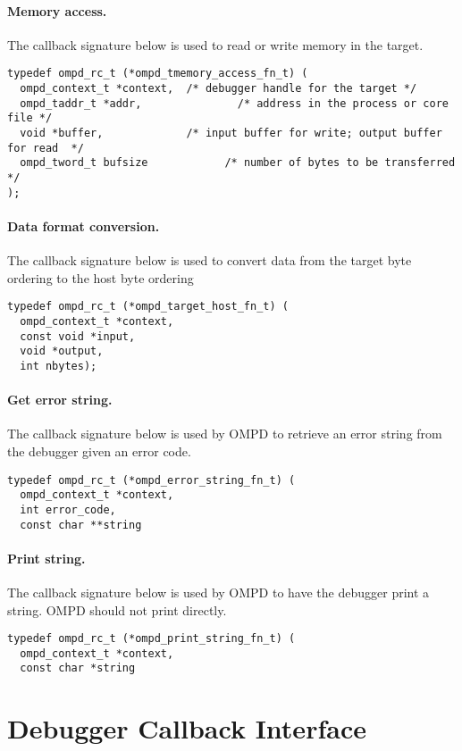 \documentclass{article}
\begin{document}
\paragraph{Memory access.} The callback signature below is used to read or write memory in the target.
\begin{verbatim}
typedef ompd_rc_t (*ompd_tmemory_access_fn_t) (
  ompd_context_t *context,  /* debugger handle for the target */
  ompd_taddr_t *addr,               /* address in the process or core file */
  void *buffer,             /* input buffer for write; output buffer for read  */
  ompd_tword_t bufsize            /* number of bytes to be transferred  */
);
\end{verbatim}

\paragraph{Data format conversion.} The callback signature below is used to convert data from the target byte ordering to the host byte ordering
\begin{verbatim}
typedef ompd_rc_t (*ompd_target_host_fn_t) (
  ompd_context_t *context, 
  const void *input, 
  void *output, 
  int nbytes);
\end{verbatim}

\paragraph{Get error string.} The callback signature below is used by OMPD to retrieve an error string from the debugger given an error code.
\begin{verbatim}
typedef ompd_rc_t (*ompd_error_string_fn_t) (
  ompd_context_t *context, 
  int error_code,
  const char **string
\end{verbatim}

\paragraph{Print string.} The callback signature below is used by OMPD to have the debugger print a string. OMPD should not print directly. 
\begin{verbatim}
typedef ompd_rc_t (*ompd_print_string_fn_t) (
  ompd_context_t *context, 
  const char *string
\end{verbatim}


\section{Debugger Callback Interface}
\label{sec:ompd_data_types}
\end{document}
